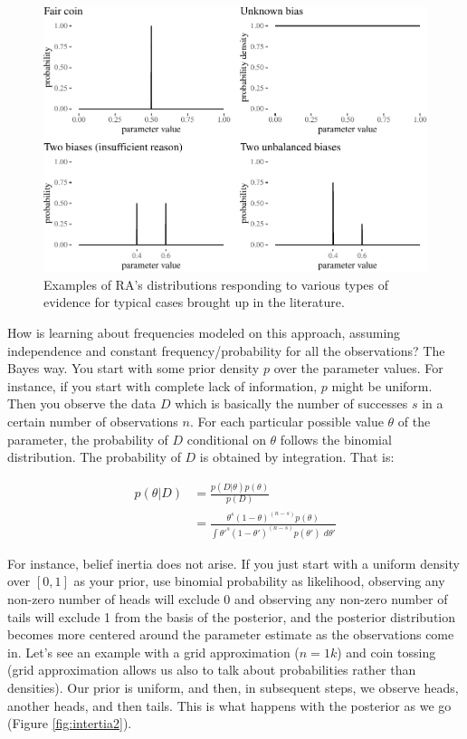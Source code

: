 \documentclass[
  10pt,
  dvipsnames,enabledeprecatedfontcommands]{scrartcl}
\begin{document}
\begin{figure}


\begin{center}\includegraphics[width=1\linewidth]{chapter-outline_files/figure-latex/fig:evidenceResponse2-1} \end{center}
\caption{Examples of RA's distributions responding to various types of evidence for typical cases brought up in the literature.}



\label{fig:evidenceResponse}
\end{figure}

How is learning about frequencies modeled on this approach, assuming
independence and constant frequency/probability for all the
observations? The Bayes way. You start with some prior density \(p\)
over the parameter values. For instance, if you start with complete lack
of information, \(p\) might be uniform. Then you observe the data \(D\)
which is basically the number of successes \(s\) in a certain number of
observations \(n\). For each particular possible value \(\theta\) of the
parameter, the probability of \(D\) conditional on \(\theta\) follows
the binomial distribution. The probability of \(D\) is obtained by
integration. That is:

\begin{align*}
p(\theta \vert D) & = \frac{p(D\vert \theta)p(\theta)}{p(D)}\\
& = \frac{\theta^s (1-\theta)^{(n - s)}p(\theta)}{\int \theta'^s (1-\theta')^{(n - s)}p(\theta')\,\, d\theta'}
\end{align*}

For instance, belief inertia does not arise. If you just start with a
uniform density over \([0,1]\) as your prior, use binomial probability
as likelihood, observing any non-zero number of heads will exclude 0 and
observing any non-zero number of tails will exclude 1 from the basis of
the posterior, and the posterior distribution becomes more centered
around the parameter estimate as the observations come in. Let's see an
example with a grid approximation (\(n=1k\)) and coin tossing (grid
approximation allows us also to talk about probabilities rather than
densities). Our prior is uniform, and then, in subsequent steps, we
observe heads, another heads, and then tails. This is what happens with
the posterior as we go (Figure \ref{fig:intertia2}).
\end{document}
